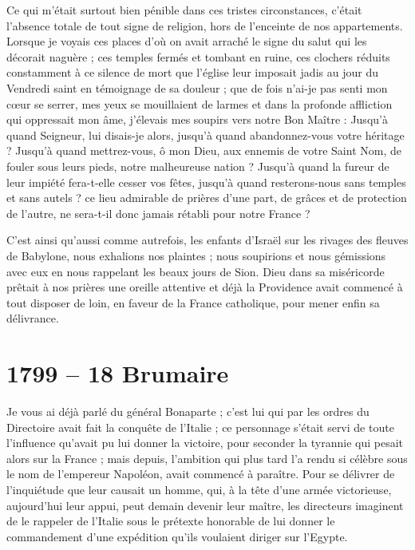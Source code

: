 \documentclass[11pt,a4paper]{report}
\begin{document}
Ce qui m'était surtout bien pénible dans ces tristes circonstances, c'était l'absence totale de tout signe de religion, hors de l'enceinte de nos appartements. Lorsque je voyais ces places d'où on avait arraché le signe du salut qui les décorait naguère ; ces temples fermés et tombant en ruine, ces clochers réduits constamment à ce silence de mort que l'église leur imposait jadis au jour du Vendredi saint en témoignage de sa douleur ; que de fois n'ai-je pas senti mon cœur se serrer, mes yeux se mouillaient de larmes et dans la profonde affliction qui oppressait mon âme, j'élevais mes soupirs vers notre Bon Maître : Jusqu'à quand Seigneur, lui disais-je alors, jusqu'à quand abandonnez-vous votre héritage ? Jusqu'à quand mettrez-vous, ô mon Dieu, aux ennemis de votre Saint Nom, de fouler sous leurs pieds, notre malheureuse nation ? Jusqu'à quand la fureur de leur impiété fera-t-elle cesser vos fêtes, jusqu'à quand resterons-nous sans temples et sans autels ? ce lieu admirable de prières d'une part, de grâces et de protection de l'autre, ne sera-t-il donc jamais rétabli pour notre France ?

C'est ainsi qu'aussi comme autrefois, les enfants d'Israël sur les rivages des fleuves de Babylone, nous exhalions nos plaintes ; nous soupirions et nous gémissions avec eux en nous rappelant les beaux jours de Sion. Dieu dans sa miséricorde prêtait à nos prières une oreille attentive et déjà la Providence avait commencé à tout disposer de loin, en faveur de la France catholique, pour mener enfin sa délivrance.

\section*{1799 -- 18 Brumaire}

Je vous ai déjà parlé du général Bonaparte ; c'est lui qui par les ordres du Directoire avait fait la conquête de l'Italie ; ce personnage s'était servi de toute l'influence qu'avait pu lui donner la victoire, pour seconder la tyrannie qui pesait alors sur la France ; mais depuis, l'ambition qui plus tard l'a rendu si célèbre sous le nom de l'empereur Napoléon, avait commencé à paraître. Pour se délivrer de l'inquiétude que leur causait un homme, qui, à la tête d'une armée victorieuse, aujourd'hui leur appui, peut demain devenir leur maître, les directeurs imaginent de le rappeler de l'Italie sous le prétexte honorable de lui donner le commandement d'une expédition qu'ils voulaient diriger sur l'Egypte.
\end{document}
